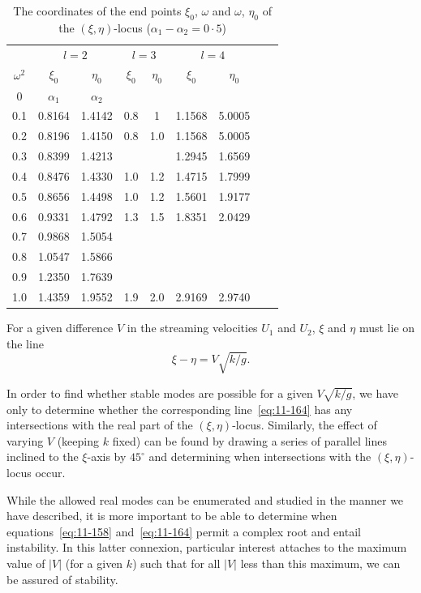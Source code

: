 \begin{table}[ht]
\centering
\caption{The coordinates of the end points $\xi_0$, $\omega$ and $\omega$, $\eta_0$ of the $(\xi,\eta)$-locus ($\alpha_1-\alpha_2 = 0{\cdot}5$)}
\label{tab:LII}
\smallskip
\begin{tabular}{c|cc|cc|cc|cc}
\hline
& \multicolumn{2}{c|}{$l=2$} & \multicolumn{2}{c|}{$l=3$} & \multicolumn{2}{c|}{$l=4$} \\
$\omega^2$ & $\xi_0$ & $\eta_0$ & $\xi_0$ & $\eta_0$ & $\xi_0$ & $\eta_0$ \\
\hline
0 & $\alpha_1$ & $\alpha_2$ & & & & \\
0.1 & 0.8164 & 1.4142 & 0.8 & 1 & 1.1568 & 5.0005 \\
0.2 & 0.8196 & 1.4150 & 0.8 & 1.0 & 1.1568 & 5.0005 \\
0.3 & 0.8399 & 1.4213 & & & 1.2945 & 1.6569 \\
0.4 & 0.8476 & 1.4330 & 1.0 & 1.2 & 1.4715 & 1.7999 \\
0.5 & 0.8656 & 1.4498 & 1.0 & 1.2 & 1.5601 & 1.9177 \\
0.6 & 0.9331 & 1.4792 & 1.3 & 1.5 & 1.8351 & 2.0429 \\
0.7 & 0.9868 & 1.5054 & & & & \\
0.8 & 1.0547 & 1.5866 & & & & \\
0.9 & 1.2350 & 1.7639 & & & & \\
1.0 & 1.4359 & 1.9552 & 1.9 & 2.0 & 2.9169 & 2.9740 \\
\hline
\end{tabular}
\end{table}

For a given difference $V$ in the streaming velocities $U_1$ and $U_2$, $\xi$ and $\eta$ must lie on the line
\begin{equation}
\label{eq:11-164}
\xi-\eta = V\sqrt{k/g}.
\end{equation}

In order to find whether stable modes are possible for a given $V\sqrt{k/g}$, we have only to determine whether the corresponding line~\eqref{eq:11-164} has any intersections with the real part of the $(\xi,\eta)$-locus. Similarly, the effect of varying $V$ (keeping $k$ fixed) can be found by drawing a series of parallel lines inclined to the $\xi$-axis by $45^\circ$ and determining when intersections with the $(\xi,\eta)$-locus occur.

While the allowed real modes can be enumerated and studied in the manner we have described, it is more important to be able to determine when equations~\eqref{eq:11-158} and~\eqref{eq:11-164} permit a complex root and entail instability. In this latter connexion, particular interest attaches to the maximum value of $|V|$ (for a given $k$) such that for all $|V|$ less than this maximum, we can be assured of stability.

